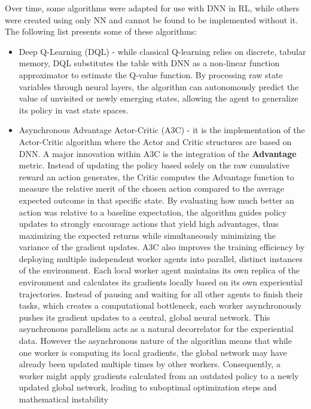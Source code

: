  Over time, some algorithms were adapted for use with DNN in RL, while others were created using only NN and cannot be found to be implemented without it. The following list presents some of these algorithms:
\begin{itemize}
	\item Deep Q-Learning (DQL) - while classical Q-learning relies on discrete, tabular memory, DQL substitutes the table with DNN as a non-linear function approximator to estimate the Q-value function. By processing raw state variables through neural layers, the algorithm can autonomously predict the value of unvisited or newly emerging states, allowing the agent to generalize its policy in vast state spaces. \cite{Reinforcement_learning_book}
	\item Asynchronous Advantage Actor-Critic (A3C) - it is the implementation of the Actor-Critic algorithm where the Actor and Critic structures are based on DNN. A major innovation within A3C is the integration of the \textbf{Advantage} metric. Instead of updating the policy based solely on the raw cumulative reward an action generates, the Critic computes the Advantage function to measure the relative merit of the chosen action compared to the average expected outcome in that specific state. By evaluating how much better an action was relative to a baseline expectation, the algorithm guides policy updates to strongly encourage actions that yield high advantages, thus maximizing the expected returns while simultaneously minimizing the variance of the gradient updates. A3C also improves the training efficiency by deploying multiple independent worker agents into parallel, distinct instances of the environment. Each local worker agent maintains its own replica of the environment and calculates its gradients locally based on its own experiential trajectories. Instead of pausing and waiting for all other agents to finish their tasks, which creates a computational bottleneck, each worker asynchronously pushes its gradient updates to a central, global neural network. This asynchronous parallelism acts as a natural decorrelator for the experiential data. However the asynchronous nature of the algorithm means that while one worker is computing its local gradients, the global network may have already been updated multiple times by other workers. Consequently, a worker might apply gradients calculated from an outdated policy to a newly updated global network, leading to suboptimal optimization steps and mathematical instability \cite{LuoRunzhou2025RoBG} %

\end{itemize}
